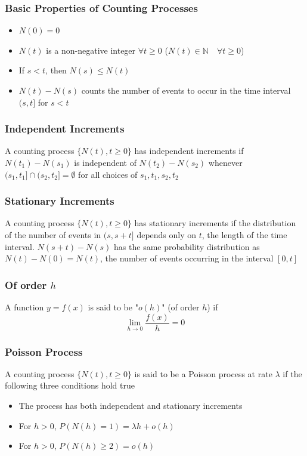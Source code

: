 \documentclass[11pt]{article}
\newcommand{\N}{{\mathbb{N}}}
\begin{document}
\subsubsection*{Basic Properties of Counting Processes}
\begin{itemize}
    \item $N(0)=0$
    \item $N(t)$ is a non-negative integer $\forall t\geq0$ ($N(t)\in\N\quad\forall t\geq0$)
    \item If $s<t$, then $N(s)\leq N(t)$
    \item $N(t)-N(s)$ counts the number of events to occur in the time interval $(s,t]$ for $s<t$
\end{itemize}
\subsubsection{Independent Increments}
A counting process $\{N(t),t\geq0\}$ has independent increments if $N(t_1)-N(s_1)$ is independent of 
$N(t_2)-N(s_2)$ whenever $(s_1,t_1]\cap(s_2,t_2]=\emptyset$ for all choices of $s_1,t_1,s_2,t_2$
\subsubsection{Stationary Increments}
A counting process $\{N(t),t\geq0\}$ has stationary increments if the distribution of the number of 
events in $(s,s+t]$ depends only on $t$, the length of the time interval. $N(s+t)-N(s)$ has the same probability distribution as $N(t)-N(0)=N(t)$, the number of events occurring in the interval $[0,t]$
\subsubsection{Of order $h$}
A function $y=f(x)$ is said to be "$o(h)$" (of order $h$) if 
\[\lim_{h\to0} \frac{f(x)}{h} = 0\]
\subsubsection{Poisson Process}
A counting process $\{N(t),t\geq 0\}$ is said to be a Poisson process at rate $\lambda$ if the following three conditions hold true 
\begin{itemize}
    \item The process has both independent and stationary increments 
    \item For $h>0$, $P(N(h)=1) = \lambda h + o(h)$
    \item For $h>0$, $P(N(h)\geq 2)=o(h)$
\end{itemize}
\end{document}
